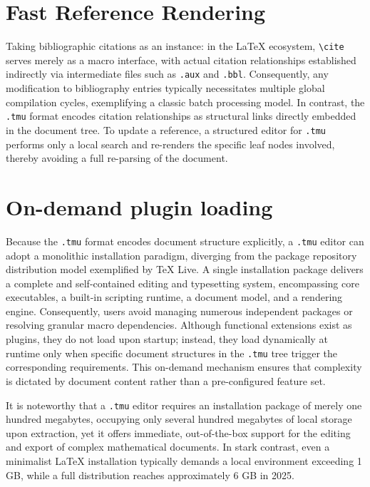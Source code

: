 \section{Fast Reference Rendering}
\label{app:ren}

Taking bibliographic citations as an instance: in the \LaTeX{} ecosystem, \verb|\cite| serves merely as a macro interface, with actual citation relationships established indirectly via intermediate files such as \verb|.aux| and \verb|.bbl|. Consequently, any modification to bibliography entries typically necessitates multiple global compilation cycles, exemplifying a classic batch processing model. In contrast, the \texttt{.tmu} format encodes citation relationships as structural links directly embedded in the document tree. To update a reference, a structured editor for \texttt{.tmu} performs only a local search and re-renders the specific leaf nodes involved, thereby avoiding a full re-parsing of the document.

\section{On-demand plugin loading}
\label{app:plug}

Because the \texttt{.tmu} format encodes document structure explicitly, a \texttt{.tmu} editor can adopt a monolithic installation paradigm, diverging from the package repository distribution model exemplified by TeX Live. A single installation package delivers a complete and self-contained editing and typesetting system, encompassing core executables, a built-in scripting runtime, a document model, and a rendering engine. Consequently, users avoid managing numerous independent packages or resolving granular macro dependencies. Although functional extensions exist as plugins, they do not load upon startup; instead, they load dynamically at runtime only when specific document structures in the \texttt{.tmu} tree trigger the corresponding requirements. This on-demand mechanism ensures that complexity is dictated by document content rather than a pre-configured feature set.

It is noteworthy that a \texttt{.tmu} editor requires an installation package of merely one hundred megabytes, occupying only several hundred megabytes of local storage upon extraction, yet it offers immediate, out-of-the-box support for the editing and export of complex mathematical documents. In stark contrast, even a minimalist \LaTeX{} installation typically demands a local environment exceeding 1 GB, while a full distribution reaches approximately 6 GB in 2025.

